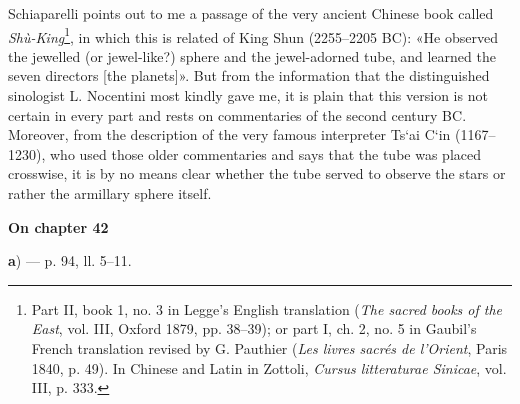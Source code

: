 \documentclass[11pt]{article}
\newcommand{\Pg}[1]{\marginpar{\footnotesize\color{gray}#1}}
\newcommand{\UnitHead}[2]{\par\setcounter{footnoteT}{0}\needspace{8\baselineskip}\bigskip\pdfbookmark[1]{#1}{unit-#2}\hypertarget{EN-#2}{}%
 {\large\bfseries\interlinepenalty=10000 #1\par}\nobreak\medskip}
\begin{document}
\par Schiaparelli points out to me a passage of the very ancient Chinese book called \emph{Shù-King}\footnote{Part II, book 1, no. 3 in Legge's English translation (\emph{The sacred books of the East}, vol. III, Oxford 1879, pp. 38–39); or part I, ch. 2, no. 5 in Gaubil's French translation revised by G. Pauthier (\emph{Les livres sacrés de l’Orient}, Paris 1840, p. 49). In Chinese and Latin in Zottoli, \emph{Cursus litteraturae Sinicae}, vol. III, p. 333.}, in which this is related of King Shun (2255–2205 BC): «He observed the jewelled (or jewel-like?) sphere and the jewel-adorned tube, and learned the seven directors [the planets]». But from the information that the distinguished sinologist L. Nocentini most kindly gave me, it is plain that this version is not certain in every part and rests on commentaries of the second century BC. Moreover, from the description of the very famous interpreter Ts‘ai C‘in (1167–1230), who used those older commentaries and says that the tube was placed crosswise, it is by no means clear whether the tube served to observe the stars or rather the armillary sphere itself.\par
\UnitHead{On chapter 42}{A42}\Pg{I 273}
\par\begin{center}\textbf{a}) — p. 94, ll. 5–11.\end{center}
\end{document}
